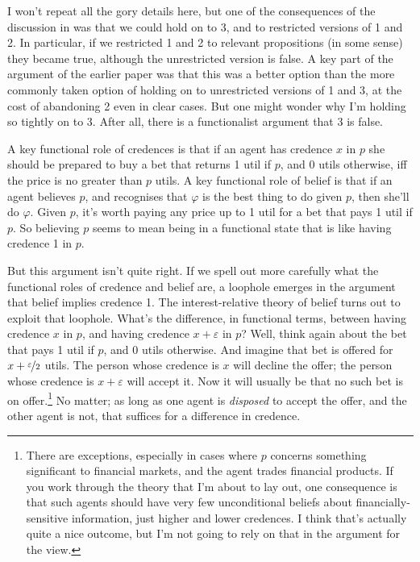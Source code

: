 \documentclass[11pt,oneside]{book}
\begin{document}
I won't repeat all the gory details here, but one of the consequences of the discussion in \cite{Weatherson2005-WEACWD} was that we could hold on to 3, and to restricted versions of 1 and 2. In particular, if we restricted 1 and 2 to relevant propositions (in some sense) they became true, although the unrestricted version is false. A key part of the argument of the earlier paper was that this was a better option than the more commonly taken option of holding on to unrestricted versions of 1 and 3, at the cost of abandoning 2 even in clear cases. But one might wonder why I'm holding so tightly on to 3. After all, there is a functionalist argument that 3 is false.

A key functional role of credences is that if an agent has credence $x$ in $p$ she should be prepared to buy a bet that returns 1 util if $p$, and 0 utils otherwise, iff the price is no greater than $p$ utils. A key functional role of belief is that if an agent believes $p$, and recognises that $\varphi$ is the best thing to do given $p$, then she'll do $\varphi$. Given $p$, it's worth paying any price up to 1 util for a bet that pays 1 util if $p$. So believing $p$ seems to mean being in a functional state that is like having credence 1 in $p$.

But this argument isn't quite right. If we spell out more carefully what the functional roles of credence and belief are, a loophole emerges in the argument that belief implies credence 1. The interest-relative theory of belief turns out to exploit that loophole. What's the difference, in functional terms, between having credence $x$ in $p$, and having credence $x + \varepsilon$ in $p$? Well, think again about the bet that pays 1 util if $p$, and 0 utils otherwise. And imagine that bet is offered for $x + \nicefrac{\varepsilon}{2}$ utils. The person whose credence is $x$ will decline the offer; the person whose credence is $x + \varepsilon$ will accept it. Now it will usually be that no such bet is on offer.\footnote{There are exceptions, especially in cases where $p$ concerns something significant to financial markets, and the agent trades financial products. If you work through the theory that I'm about to lay out, one consequence is that such agents should have very few unconditional beliefs about financially-sensitive information, just higher and lower credences. I think that's actually quite a nice outcome, but I'm not going to rely on that in the argument for the view.} No matter; as long as one agent is \textit{disposed} to accept the offer, and the other agent is not, that suffices for a difference in credence.
\end{document}
